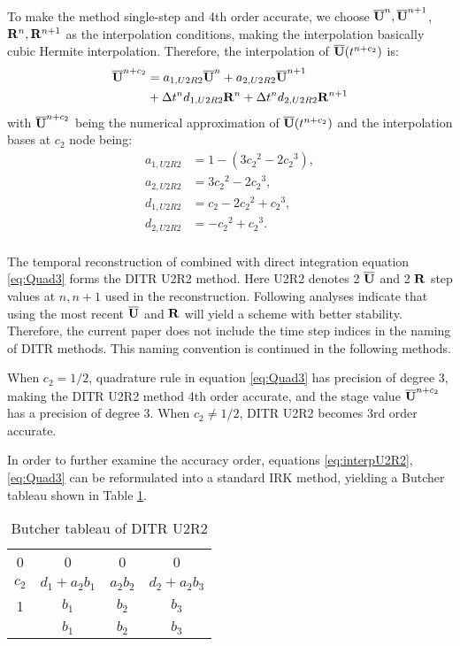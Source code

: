 To make the method single-step and 4th order accurate,
we choose $\overline{\mathbf{U}}^{n},\overline{\mathbf{U}}^{n+1}$, $\mathbf{R}^{n},\mathbf{R}^{n+1}$ as
the interpolation conditions, making the interpolation
basically cubic Hermite interpolation.
Therefore, the interpolation of $\overline{\mathbf{U}}(t^{n+c_2})$
is:
\begin{equation}
    \begin{aligned}
        \label{eq:TRU2R2}
        \overline{\mathbf{U}}^{n+c_2} & =
        a_{1,U2R2}\overline{\mathbf{U}}^{n} +
        a_{2,U2R2}\overline{\mathbf{U}}^{n + 1}
        \\ & +
        {\Delta} t^n d_{1,U2R2}\mathbf{R}^{n} +
        {\Delta} t^n d_{2,U2R2}\mathbf{R}^{n + 1}
    \end{aligned}
\end{equation}
with $\overline{\mathbf{U}}^{n+c_2}$ being
the numerical approximation
of $\overline{\mathbf{U}}(t^{n+c_2})$
and the interpolation bases at $c_2$ node being:
\begin{equation}
    \begin{aligned}
        a_{1,U2R2} & = 1 - (3{c_2}^2 - 2 {c_2}^3) , \\
        a_{2,U2R2} & = 3{c_2}^2 - 2 {c_2}^3 ,       \\
        d_{1,U2R2} & = {c_2} - 2 {c_2}^2 + {c_2}^3, \\
        d_{2,U2R2} & = - {c_2}^2 + {c_2}^3 .        \\
    \end{aligned}
    \label{eq:interpU2R2}
\end{equation}

The temporal reconstruction of 
combined with direct integration equation \eqref{eq:Quad3}
forms the DITR U2R2 method.
Here U2R2 denotes 2 $\overline{\mathbf{U}}$ and 2 $\mathbf{R}$
step values at $n,n+1$ used in the reconstruction.
Following analyses indicate that using
the most recent $\overline{\mathbf{U}}$ and $\mathbf{R}$
will yield a scheme with better stability.
Therefore, the current paper does not include the
time step indices in the naming of DITR methods.
This naming convention is continued in the following
methods.

When $c_2=1/2$, quadrature rule in equation \eqref{eq:Quad3} has precision
of degree 3, making the DITR U2R2 method 4th order accurate,
and the stage value $\overline{\mathbf{U}}^{n+c_2}$ has a precision of degree 3.
When $c_2\neq1/2$, DITR U2R2 becomes 3rd order accurate.

In order to further examine the accuracy order,
equations \eqref{eq:interpU2R2}, \eqref{eq:Quad3}
can be reformulated into a standard IRK method,
yielding a Butcher tableau shown in Table \ref{tab:U2R2Butcher}.
\begin{table}[htbp]
    \centering
    \begin{tabular}{c|ccc}
        0     & 0              & 0        & 0              \\
        $c_2$ & $d_1 + a_2b_1$ & $a_2b_2$ & $d_2 + a_2b_3$ \\
        1     & $b_1$          & $b_2$    & $b_3$          \\ \hline
              & $b_1$          & $b_2$    & $b_3$
    \end{tabular}
    \caption{Butcher tableau of DITR U2R2}
    \label{tab:U2R2Butcher}
\end{table}

